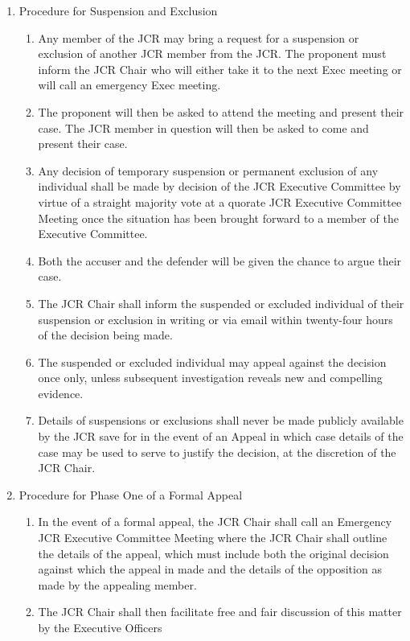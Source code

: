 \begin{enumerate}
\begin{enumerate}
    \end{enumerate}
    \item Procedure for Suspension and Exclusion
    \begin{enumerate}
        \item Any member of the JCR may bring a request for a suspension or exclusion of another JCR member from the JCR. The proponent must inform the JCR Chair who will either take it to the next Exec meeting or will call an emergency Exec meeting.
        \item The proponent will then be asked to attend the meeting and present their case. The JCR member in question will then be asked to come and present their case.
        \item Any decision of temporary suspension or permanent exclusion of any individual shall be made by decision of the JCR Executive Committee by virtue of a straight majority vote at a quorate JCR Executive Committee Meeting once the situation has been brought forward to a member of the Executive Committee.
        \item Both the accuser and the defender will be given the chance to argue their case.
        \item The JCR Chair shall inform the suspended or excluded individual of their suspension or exclusion in
        writing or via email within twenty-four hours of the decision being made.
        \item The suspended or excluded individual may appeal against the decision once only, unless subsequent investigation reveals new and compelling evidence.
        \item Details of suspensions or exclusions shall never be made publicly available by the JCR save for in the event of an Appeal in which case details of the case may be used to serve to justify the decision, at the discretion of the JCR Chair.
    \end{enumerate}
    \item Procedure for Phase One of a Formal Appeal
    \begin{enumerate}
        \item In the event of a formal appeal, the JCR Chair shall call an Emergency JCR Executive Committee Meeting where the JCR Chair shall outline the details of the appeal, which must include both the original decision against which the appeal in made and the details of the opposition as made by the appealing member.
        \item The JCR Chair shall then facilitate free and fair discussion of this matter by the Executive Officers

\end{enumerate}
\end{enumerate}
